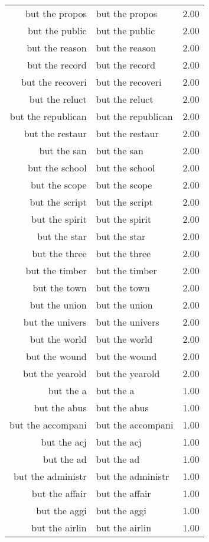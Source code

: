 \begin{table}[ht]
\begin{tabular}{rlr}
  but the propos & but the propos & 2.00 \\ 
  but the public & but the public & 2.00 \\ 
  but the reason & but the reason & 2.00 \\ 
  but the record & but the record & 2.00 \\ 
  but the recoveri & but the recoveri & 2.00 \\ 
  but the reluct & but the reluct & 2.00 \\ 
  but the republican & but the republican & 2.00 \\ 
  but the restaur & but the restaur & 2.00 \\ 
  but the san & but the san & 2.00 \\ 
  but the school & but the school & 2.00 \\ 
  but the scope & but the scope & 2.00 \\ 
  but the script & but the script & 2.00 \\ 
  but the spirit & but the spirit & 2.00 \\ 
  but the star & but the star & 2.00 \\ 
  but the three & but the three & 2.00 \\ 
  but the timber & but the timber & 2.00 \\ 
  but the town & but the town & 2.00 \\ 
  but the union & but the union & 2.00 \\ 
  but the univers & but the univers & 2.00 \\ 
  but the world & but the world & 2.00 \\ 
  but the wound & but the wound & 2.00 \\ 
  but the yearold & but the yearold & 2.00 \\ 
  but the a & but the a & 1.00 \\ 
  but the abus & but the abus & 1.00 \\ 
  but the accompani & but the accompani & 1.00 \\ 
  but the acj & but the acj & 1.00 \\ 
  but the ad & but the ad & 1.00 \\ 
  but the administr & but the administr & 1.00 \\ 
  but the affair & but the affair & 1.00 \\ 
  but the aggi & but the aggi & 1.00 \\ 
  but the airlin & but the airlin & 1.00 \\ 

\end{tabular}
\end{table}
